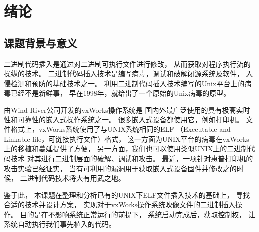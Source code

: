 \chapter{绪论}

%
%
%

\section{课题背景与意义}

二进制代码插入是通过对二进制可执行文件进行修改，
从而获取对程序执行流的操纵的技术。
二进制代码插入技术是编写病毒，调试和破解闭源系统及软件，
入侵检测和预防的基础技术之一。
利用二进制代码插入技术编写的Unix平台上的病毒已经不是新鲜事，
早在1998年，\cite{silvio}就给出了一个原始的Unix病毒的原型。

由Wind River公司开发的vxWorks操作系统是
国内外最广泛使用的具有极高实时性和可靠性的嵌入式操作系统之一。
很多嵌入式设备都使用它，例如打印机。
文件格式上，vxWorks系统使用了与UNIX系统相同的ELF
（Executable and Linkable file，可链接执行文件）格式，
这一方面为UNIX平台的病毒在vxWorks上的移植和蔓延提供了方便，
另一方面，我们也可以使用类似UNIX上的二进制代码技术
对其进行二进制层面的破解、调试和攻击。
最近，一项针对惠普打印机的攻击实验已经证实，
当有可利用的漏洞用于获取嵌入式设备固件并修改之的时候，
二进制代码技术将大有用武之地。


鉴于此，
本课题在整理和分析已有的UNIX下ELF文件插入技术的基础上，
寻找合适的技术并设计方案，
实现对于vxWorks操作系统映像文件的二进制插入操作。
目的是在不影响系统正常运行的前提下，
系统启动完成后，获取控制权，
让系统自动执行我们事先植入的代码。

